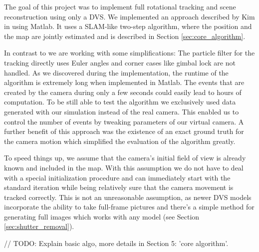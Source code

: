 The goal of this project was to implement full rotational tracking and scene
reconstruction using only a DVS. We implemented an approach described by Kim \etal
in \cite{kim2014simultaneous} using Matlab. It uses a SLAM-like two-step
algorithm, where the position and the map are jointly estimated and is
described in Section \ref{sec:core_algorithm}.

In contrast to \cite{kim2014simultaneous} we are working with some
simplifications: The particle filter for the tracking directly uses Euler
angles and corner cases like gimbal lock are not handled.
As we discovered during the implementation, the runtime of the algorithm is
extremely long when implemented in Matlab. The events that are created by the
camera during only a few seconds could easily lead to hours of computation.
To be still able to test the algorithm we exclusively used data generated with
our simulation instead of the real camera.
This enabled us to control the number of events by tweaking parameters of our
virtual camera.
A further benefit of this approach was the existence of an exact ground truth
for the camera motion which simplified the evaluation of the algorithm greatly.

To speed things up, we assume that the camera's initial field
of view is already known and included in the map. With this assumption we do
not have to deal with a special initialization procedure and can immediately
start with the standard iteration while being relatively sure that the camera
movement is tracked correctly.
This is not an unreasonable assumption, as newer DVS models incorporate the
ability to take full-frame pictures and there's a simple method for generating
full images which works with any model (see Section \ref{sec:shutter_removal}).


// TODO: Explain basic algo, more details in Section 5: 'core algorithm'.
